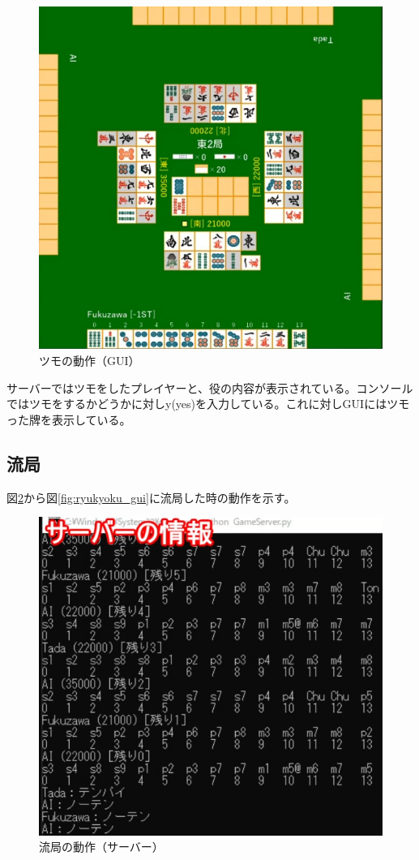 \documentclass[a4j,titlepage]{jsarticle}
\begin{document}
\begin{figure}[htbp]
  \centering
  \includegraphics[width = 0.8\linewidth]{images/tsumo_gui.png}
  \caption{ツモの動作（GUI）}
  \label{fig:tsumo_gui}
\end{figure}

サーバーではツモをしたプレイヤーと、役の内容が表示されている。コンソールではツモをするかどうかに対しy(yes)を入力している。これに対しGUIにはツモった牌を表示している。

\subsection{流局}
図\ref{fig:ryukyoku_server}から図\ref{fig:ryukyoku_gui}に流局した時の動作を示す。

\begin{figure}[htbp]
  \centering
  \includegraphics[width = 0.7\linewidth]{images/ryukyoku_server.png}
  \caption{流局の動作（サーバー）}
  \label{fig:ryukyoku_server}
\end{figure}
\end{document}
